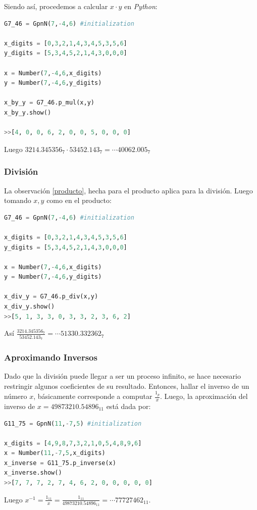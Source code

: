 Siendo así, procedemos a calcular $x\cdot y$ en \textit{Python}:
\begin{lstlisting}[language = Python, caption = producto de números en $\mathit{G7\_46}$]
G7_46 = GpnN(7,-4,6) #initialization

x_digits = [0,3,2,1,4,3,4,5,3,5,6]
y_digits = [5,3,4,5,2,1,4,3,0,0,0]

x = Number(7,-4,6,x_digits)
y = Number(7,-4,6,y_digits)

x_by_y = G7_46.p_mul(x,y)
x_by_y.show()

>>[4, 0, 0, 6, 2, 0, 0, 5, 0, 0, 0]
\end{lstlisting}
Luego $3214.345356_7\cdot 53452.143_7=\cdots40062.005_7$

\subsubsection{División}
La observación \ref{producto}, hecha para el producto aplica para la división. Luego tomando $x,y$ como en el producto:

\begin{lstlisting}[language = Python, caption = división de números en $\mathit{G7\_46}$]
G7_46 = GpnN(7,-4,6) #initialization

x_digits = [0,3,2,1,4,3,4,5,3,5,6]
y_digits = [5,3,4,5,2,1,4,3,0,0,0]

x = Number(7,-4,6,x_digits)
y = Number(7,-4,6,y_digits)

x_div_y = G7_46.p_div(x,y)
x_div_y.show()
>>[5, 1, 3, 3, 0, 3, 3, 2, 3, 6, 2]
\end{lstlisting}
Así $\frac{3214.345356_7}{53452.143_7}=\cdots51330.332362_7$
\subsubsection{Aproximando Inversos}
Dado que la división puede llegar a ser un proceso infinito, se hace necesario restringir algunos coeficientes de su resultado. Entonces, hallar el inverso de un número $x$, básicamente corresponde a computar $\frac{1_p}{x}$. Luego, la aproximación del inverso de $x=49873210.54896_{11}$ está dada por:
\begin{lstlisting}[language = Python, caption = inversión de números en $\mathit{G11\_75}$]
G11_75 = GpnN(11,-7,5) #initialization

x_digits = [4,9,8,7,3,2,1,0,5,4,8,9,6]
x = Number(11,-7,5,x_digits)
x_inverse = G11_75.p_inverse(x)
x_inverse.show()
>>[7, 7, 7, 2, 7, 4, 6, 2, 0, 0, 0, 0, 0]
\end{lstlisting}
Luego $x^{-1}=\frac{1_{11}}{x}=\frac{1_{11}}{49873210.54896_{11}} = \cdots77727462_{11}$. 

